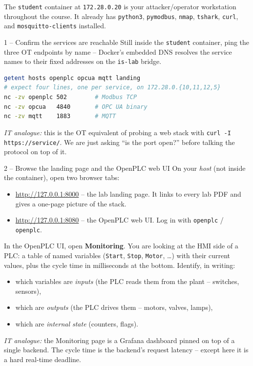 \documentclass[11pt,a4paper]{article}
\begin{document}
The \texttt{student} container at \texttt{172.28.0.20} is your
attacker/operator workstation throughout the course. It already has
\texttt{python3}, \texttt{pymodbus}, \texttt{nmap}, \texttt{tshark},
\texttt{curl}, and \texttt{mosquitto-clients} installed.

\begin{stepbox}{1 -- Confirm the services are reachable}
Still inside the \texttt{student} container, ping the three OT
endpoints by name -- Docker's embedded DNS resolves the service names
to their fixed addresses on the \texttt{is-lab} bridge.

\begin{lstlisting}[language=bash]
getent hosts openplc opcua mqtt landing
# expect four lines, one per service, on 172.28.0.{10,11,12,5}
nc -zv openplc 502        # Modbus TCP
nc -zv opcua   4840       # OPC UA binary
nc -zv mqtt    1883       # MQTT
\end{lstlisting}

\emph{IT analogue:} this is the OT equivalent of probing a web stack
with \texttt{curl -I https://service/}. We are just asking ``is the
port open?'' before talking the protocol on top of it.
\end{stepbox}

\begin{stepbox}{2 -- Browse the landing page and the OpenPLC web UI}
On your \emph{host} (not inside the container), open two browser tabs:

\begin{itemize}\setlength{\itemsep}{1pt}
  \item \url{http://127.0.0.1:8000} -- the lab landing page. It links
        to every lab PDF and gives a one-page picture of the stack.
  \item \url{http://127.0.0.1:8080} -- the OpenPLC web UI. Log in
        with \texttt{openplc} / \texttt{openplc}.
\end{itemize}

In the OpenPLC UI, open \textbf{Monitoring}. You are looking at the
HMI side of a PLC: a table of named variables (\texttt{Start},
\texttt{Stop}, \texttt{Motor}, \ldots) with their current values, plus
the cycle time in milliseconds at the bottom. Identify, in writing:

\begin{itemize}\setlength{\itemsep}{1pt}
  \item which variables are \emph{inputs} (the PLC reads them from the
        plant -- switches, sensors),
  \item which are \emph{outputs} (the PLC drives them -- motors,
        valves, lamps),
  \item which are \emph{internal state} (counters, flags).
\end{itemize}

\emph{IT analogue:} the Monitoring page is a Grafana dashboard pinned
on top of a single backend. The cycle time is the backend's request
latency -- except here it is a hard real-time deadline.
\end{stepbox}
\end{document}
